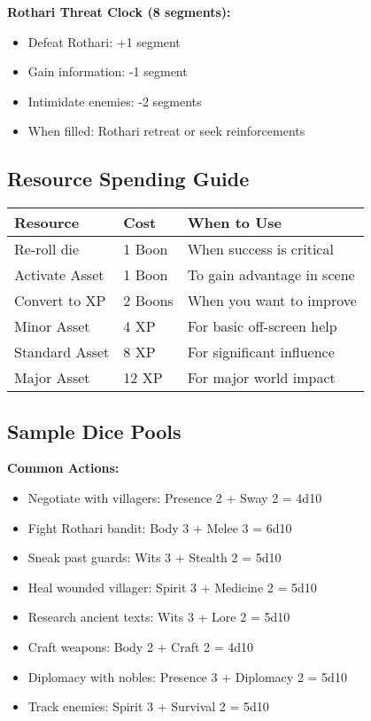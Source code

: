 \documentclass[11pt]{article}
\newcommand{\checkmark}{\ding{51}}
\begin{document}
\textbf{Rothari Threat Clock (8 segments):}
\begin{itemize}
\item \checkmark Defeat Rothari: +1 segment
\item \checkmark Gain information: -1 segment
\item \checkmark Intimidate enemies: -2 segments
\item When filled: Rothari retreat or seek reinforcements
\end{itemize}

\subsection{Resource Spending Guide}

\begin{center}
\begin{tabular}{|l|l|l|}
\hline
\textbf{Resource} & \textbf{Cost} & \textbf{When to Use} \\
\hline
Re-roll die & 1 Boon & When success is critical \\
Activate Asset & 1 Boon & To gain advantage in scene \\
Convert to XP & 2 Boons & When you want to improve \\
Minor Asset & 4 XP & For basic off-screen help \\
Standard Asset & 8 XP & For significant influence \\
Major Asset & 12 XP & For major world impact \\
\hline
\end{tabular}
\end{center}

\subsection{Sample Dice Pools}

\textbf{Common Actions:}
\begin{itemize}
\item Negotiate with villagers: Presence 2 + Sway 2 = 4d10
\item Fight Rothari bandit: Body 3 + Melee 3 = 6d10
\item Sneak past guards: Wits 3 + Stealth 2 = 5d10
\item Heal wounded villager: Spirit 3 + Medicine 2 = 5d10
\item Research ancient texts: Wits 3 + Lore 2 = 5d10
\item Craft weapons: Body 2 + Craft 2 = 4d10
\item Diplomacy with nobles: Presence 3 + Diplomacy 2 = 5d10
\item Track enemies: Spirit 3 + Survival 2 = 5d10
\end{itemize}
\end{document}
